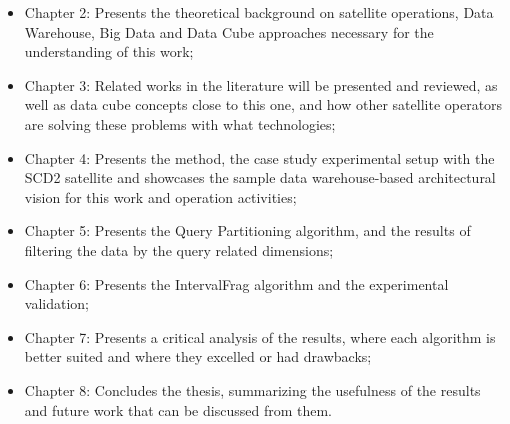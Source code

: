 \begin{itemize}[noitemsep]
  \item{Chapter 2}: Presents the theoretical background on satellite operations, Data Warehouse, Big Data and Data Cube approaches necessary for the understanding of this work;
  \item{Chapter 3}: Related works in the literature will be presented and reviewed, as well as data cube concepts close to this one, and how other satellite operators are solving these problems with what technologies;
  \item{Chapter 4}: Presents the method, the case study experimental setup with the SCD2 satellite and showcases the sample data warehouse-based architectural vision for this work and operation activities;
  \item{Chapter 5}: Presents the Query Partitioning algorithm, and the results of filtering the data by the query related dimensions;
  \item{Chapter 6}: Presents the IntervalFrag algorithm and the experimental validation;
  \item{Chapter 7}: Presents a critical analysis of the results, where each algorithm is better suited and where they excelled or had drawbacks;
  \item{Chapter 8}: Concludes the thesis, summarizing the usefulness of the results and future work that can be discussed from them.
\end{itemize}

